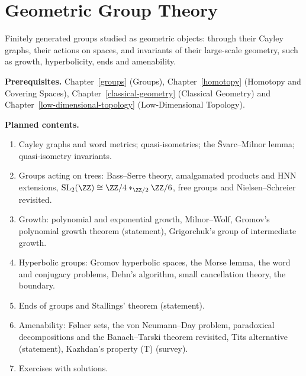 \chapter{Geometric Group Theory}\label{geometric-group-theory}

Finitely generated groups studied as geometric objects: through their Cayley graphs, their actions on spaces, and invariants of their large-scale geometry, such as growth, hyperbolicity, ends and
amenability.

\noindent\textbf{Prerequisites.} Chapter~\ref{groups} (Groups), Chapter~\ref{homotopy} (Homotopy and Covering Spaces), Chapter~\ref{classical-geometry} (Classical Geometry) and
Chapter~\ref{low-dimensional-topology} (Low-Dimensional Topology).

\noindent\textbf{Planned contents.}
\begin{enumerate}
\item Cayley graphs and word metrics; quasi-isometries; the Švarc--Milnor lemma; quasi-isometry invariants.
\item Groups acting on trees: Bass--Serre theory, amalgamated products and HNN extensions, $\mathrm{SL}_2(\ZZ) \cong \ZZ/4 *_{\ZZ/2} \ZZ/6$, free groups and Nielsen--Schreier revisited.
\item Growth: polynomial and exponential growth, Milnor--Wolf, Gromov's polynomial growth theorem (statement), Grigorchuk's group of intermediate growth.
\item Hyperbolic groups: Gromov hyperbolic spaces, the Morse lemma, the word and conjugacy problems, Dehn's algorithm, small cancellation theory, the boundary.
\item Ends of groups and Stallings' theorem (statement).
\item Amenability: Følner sets, the von Neumann--Day problem, paradoxical decompositions and the Banach--Tarski theorem revisited, Tits alternative (statement), Kazhdan's property (T) (survey).
\item Exercises with solutions.
\end{enumerate}
